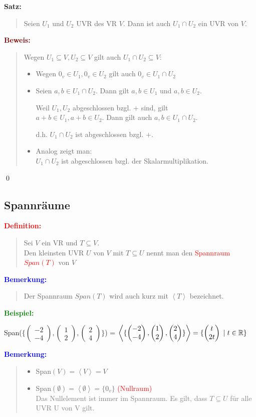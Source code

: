 \documentclass{article}
\newcommand{\smsp}{\phantom{\hspace{3px}}}
\newcommand{\red}[1]{\textcolor{red}{#1}}
\newcommand{\gray}[1]{\textcolor{gray}{#1}}
\newcommand{\blue}[1]{\textcolor{blue}{#1}}
\newcommand{\green}[1]{\textcolor{green}{#1}}
\newcommand{\dgr}[1]{\textcolor{dgr}{#1}}
\newcommand{\maroon}[1]{\textcolor{maroon}{#1}}
\newcommand{\ex}{\green{\textbf{Beispiel: }}}
\newcommand{\de}[1]{\red{\textbf{Definition: }}\begin{quote}#1\end{quote}}
\newcommand{\an}[1]{\blue{\textbf{Bemerkung: }}\begin{quote}#1\end{quote}}
\newcommand{\se}[1]{\dgr{\textbf{Satz: }}\begin{quote}#1\end{quote}}
\newcommand{\pr}[1]{\maroon{\textbf{Beweis: }}\begin{quote}#1\end{quote}\qed}
\newcommand{\R}{\mathbb{R}}
\renewcommand{\st}{\smsp | \smsp}
\newcommand{\vvec}[2]{\begin{pmatrix}#1\\#2\end{pmatrix}}
\newcommand{\spann}[1]{\left\langle#1\right\rangle}
\begin{document}
\se{
    Seien $U_1$ und $U_2$ UVR des VR $V$. Dann ist auch $U_1 \cap U_2$ ein UVR von $V$.
}
\pr{
    Wegen $U_1 \subseteq V, U_2 \subseteq V$ gilt auch $U_1 \cap U_2 \subseteq V$:
    \begin{itemize}
        \item Wegen $0_v \in U_1, 0_v \in U_2$ gilt auch $0_v \in U_1 \cap U_2$
        \item Seien $a,b \in U_1 \cap U_2$. Dann gilt $a,b \in U_1$ und $a,b \in U_2$.
        
        Weil $U_1, U_2$ abgeschlossen bzgl. $+$ sind, gilt\\
        $a + b \in U_1, a+b \in U_2$. Dann gilt auch $a,b \in U_1 \cap U_2$.

        d.h. $U_1 \cap U_2$ ist abgeschlossen bzgl. $+$.
        \item Analog zeigt man:\\
        $U_1 \cap U_2$ ist abgeschlossen bzgl. der Skalarmultiplikation.
    \end{itemize}
}

\newpage
\subsection{Spannräume}
\de{
    Sei $V$ ein VR und $T \subseteq V$.\\
    Den kleinsten UVR $U$ von $V$ mit $T \subseteq U$ nennt man den \red{Spannraum $Span(T)$} von $V$
}
\an{Der Spannraum $Span(T)$ wird auch kurz mit $\spann{T}$ bezeichnet.}
\ex 

Span($\{\vvec{-2}{-4}, \vvec{1}{2}, \vvec{2}{4}\}$) = $\spann{\{\vvec{-2}{-4}, \vvec{1}{2}, \vvec{2}{4}\}} = \{\vvec{t}{2t} \st t \in \R\}$

\an{
    \begin{itemize}
        \item Span$(V) = \spann{V} = V$
        \item Span$(\emptyset) = \spann{\emptyset} = \{0_v\}$ \red{(Nullraum)}\\
        \gray{Das Nullelement ist immer im Spannraum. Es gilt, dass $T \subseteq U$ für alle UVR U von V gilt.}
    \end{itemize}
}
\end{document}
